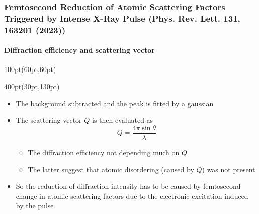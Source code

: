 \begin{frame}
\frametitle{Femtosecond Reduction of Atomic Scattering Factors Triggered by 
Intense X-Ray Pulse \small (Phys. Rev. Lett. \textbf{131}, 163201 (2023))}
\framesubtitle{Diffraction efficiency and scattering vector}

\begin{textblock*}{100pt}(60pt,60pt)

\end{textblock*}

\small
\begin{textblock*}{400pt}(30pt,130pt)
\begin{itemize}
\footnotesize
\item The background subtracted and the peak is fitted by a gaussian  
\item The scattering vector $Q$ is then evaluated as
\begin{equation}
Q = \frac{4\pi \sin \theta}{\lambda}
\end{equation}
\begin{itemize}
\footnotesize
\item[$\bullet$] The diffraction efficiency not depending much on $Q$
\item[$\bullet$] The latter suggest that atomic disordering (caused by $Q$) 
was not present
\end{itemize}
\item So the reduction of diffraction intensity has to be caused 
by femtosecond change in atomic scattering factors due to the electronic excitation induced by the pulse
\end{itemize}
\end{textblock*}


\end{frame}




